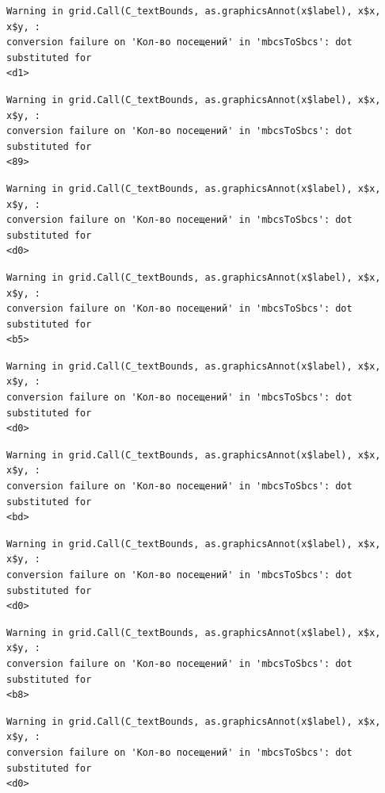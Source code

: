 \documentclass[
  letterpaper,
  DIV=11,
  numbers=noendperiod]{scrartcl}
\begin{document}
\begin{verbatim}
Warning in grid.Call(C_textBounds, as.graphicsAnnot(x$label), x$x, x$y, :
conversion failure on 'Кол-во посещений' in 'mbcsToSbcs': dot substituted for
<d1>
\end{verbatim}

\begin{verbatim}
Warning in grid.Call(C_textBounds, as.graphicsAnnot(x$label), x$x, x$y, :
conversion failure on 'Кол-во посещений' in 'mbcsToSbcs': dot substituted for
<89>
\end{verbatim}

\begin{verbatim}
Warning in grid.Call(C_textBounds, as.graphicsAnnot(x$label), x$x, x$y, :
conversion failure on 'Кол-во посещений' in 'mbcsToSbcs': dot substituted for
<d0>
\end{verbatim}

\begin{verbatim}
Warning in grid.Call(C_textBounds, as.graphicsAnnot(x$label), x$x, x$y, :
conversion failure on 'Кол-во посещений' in 'mbcsToSbcs': dot substituted for
<b5>
\end{verbatim}

\begin{verbatim}
Warning in grid.Call(C_textBounds, as.graphicsAnnot(x$label), x$x, x$y, :
conversion failure on 'Кол-во посещений' in 'mbcsToSbcs': dot substituted for
<d0>
\end{verbatim}

\begin{verbatim}
Warning in grid.Call(C_textBounds, as.graphicsAnnot(x$label), x$x, x$y, :
conversion failure on 'Кол-во посещений' in 'mbcsToSbcs': dot substituted for
<bd>
\end{verbatim}

\begin{verbatim}
Warning in grid.Call(C_textBounds, as.graphicsAnnot(x$label), x$x, x$y, :
conversion failure on 'Кол-во посещений' in 'mbcsToSbcs': dot substituted for
<d0>
\end{verbatim}

\begin{verbatim}
Warning in grid.Call(C_textBounds, as.graphicsAnnot(x$label), x$x, x$y, :
conversion failure on 'Кол-во посещений' in 'mbcsToSbcs': dot substituted for
<b8>
\end{verbatim}

\begin{verbatim}
Warning in grid.Call(C_textBounds, as.graphicsAnnot(x$label), x$x, x$y, :
conversion failure on 'Кол-во посещений' in 'mbcsToSbcs': dot substituted for
<d0>
\end{verbatim}
\end{document}
